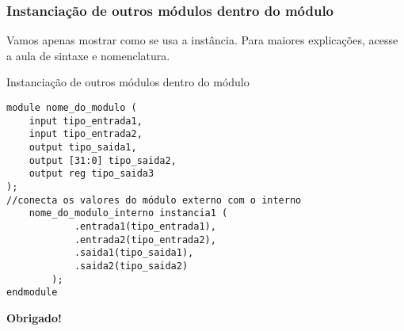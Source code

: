 \documentclass{beamer}
\begin{document}
\begin{frame}
\frametitle{Instanciação de outros módulos dentro do módulo}

Vamos apenas mostrar como se usa a instância. Para maiores explicações, acesse a aula de sintaxe e nomenclatura.
\end{frame}

\begin{frame}[fragile]{Instanciação de outros módulos dentro do módulo}
\small
\begin{verbatim}
module nome_do_modulo (
    input tipo_entrada1,
    input tipo_entrada2,
    output tipo_saida1, 
    output [31:0] tipo_saida2, 
    output reg tipo_saida3 
);
//conecta os valores do módulo externo com o interno
    nome_do_modulo_interno instancia1 ( 
            .entrada1(tipo_entrada1), 
            .entrada2(tipo_entrada2),
            .saida1(tipo_saida1),
            .saida2(tipo_saida2)
        );
endmodule
\end{verbatim}
\end{frame}

\begin{frame}[plain]
    \centering
    {\Huge \textbf{Obrigado!}}
\end{frame}
\end{document}
